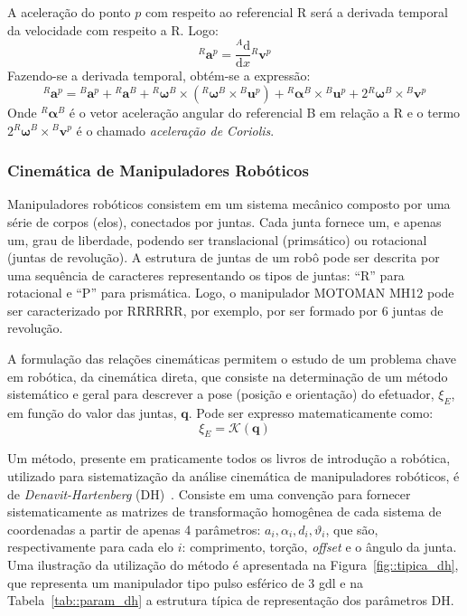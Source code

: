 A aceleração do ponto $p$ com respeito ao referencial R será a derivada temporal
da velocidade com respeito a R. Logo:
%
\begin{equation}
	^{R}\mathbf{a}^{p} = \frac{^{A}\mathrm{d} }{\mathrm{d} x} {^{R}\mathbf{v}^{p}}
\end{equation}
%
Fazendo-se a derivada temporal, obtém-se a expressão:
%
\begin{equation}
	^{R}\mathbf{a}^{p} = {}^{B}\mathbf{a}^{p} + {}^{R}\mathbf{a}^{B} +
	{}^{R}\boldsymbol{\omega}^{B} \times ({}^{R}\boldsymbol{\omega}^{B} \times
	{}^{B}\mathbf{u}^{p}) + {}^{R}\boldsymbol{\alpha}^{B} \times {}^{B}\mathbf{u}^{p}
	+ 2{}^{R}\boldsymbol{\omega}^{B} \times {}^{B}\mathbf{v}^{p}
\end{equation}
%
Onde ${}^{R}\boldsymbol{\alpha}^{B}$ é o vetor aceleração angular do referencial
B em relação a R e o termo $2{}^{R}\boldsymbol{\omega}^{B} \times
{}^{B}\mathbf{v}^{p}$ é o chamado \emph{aceleração de Coriolis}. 


\subsubsection{Cinemática de Manipuladores Robóticos}

Manipuladores robóticos consistem em um sistema mecânico composto por uma série
de corpos (elos), conectados por juntas. Cada junta fornece um, e apenas um,
grau de liberdade, podendo ser translacional (primsático) ou rotacional (juntas de
revolução). A estrutura de juntas de um robô pode ser descrita por uma sequência
de caracteres representando os tipos de juntas: ``R'' para rotacional e ``P''
para prismática. Logo, o manipulador MOTOMAN MH12 pode ser caracterizado por
RRRRRR, por exemplo, por ser formado por 6 juntas de revolução.

A formulação das relações cinemáticas permitem o estudo de um problema chave em
robótica, da cinemática direta, que consiste na determinação de um método
sistemático e geral para descrever a pose (posição e orientação) do
efetuador, $\xi_{E}$, em função do valor das juntas, $\mathbf{q}$. Pode ser
expresso matematicamente como:
%
\begin{equation}
	\xi_{E} = \mathcal{K}(\mathbf{q})
\end{equation}
%

Um método, presente em praticamente todos os livros de introdução a robótica,
utilizado para sistematização da análise cinemática de manipuladores robóticos,
é de \emph{Denavit-Hartenberg} (DH)~\cite{denavit1955}.
Consiste em uma convenção para fornecer sistematicamente as matrizes de
transformação homogênea de cada sistema de coordenadas a partir de apenas 4
parâmetros:
$a_i, \alpha_i, d_i, \vartheta_i$, que são, respectivamente para cada elo $i$:
comprimento, torção, \textit{offset} e o ângulo da junta.
Uma ilustração da utilização do método é apresentada na
Figura~\ref{fig::tipica_dh}, que representa um manipulador tipo pulso esférico
de 3 gdl e na Tabela~\ref{tab::param_dh} a estrutura típica de representação dos
parâmetros DH.

